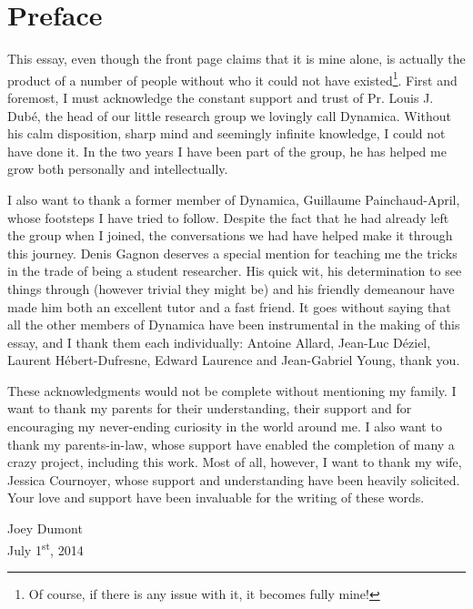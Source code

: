 \chapter*{Preface}
\renewcommand*{\thefootnote}{\fnsymbol{footnote}}
This essay, even though the front page claims that it is mine alone, 
is actually the product of a number of people without who it
could not have existed\footnote{Of course, if there is any issue
with it, it becomes fully mine!}. First and foremost, I must acknowledge
the constant support and trust of Pr. Louis J. Dubé, the head
of our little research group we lovingly call Dynamica. Without his calm
disposition, sharp mind and seemingly infinite knowledge, I could not have done it.
In the two years I have been part of the group, he has helped
me grow both personally and intellectually. 

I also want to thank a former member of Dynamica, 
Guillaume Painchaud-April, whose footsteps I have
tried to follow. Despite the fact that he had already left
the group when I joined, the conversations we had have helped
make it through this journey. Denis Gagnon deserves a special mention
for teaching me the tricks in the trade of being a student
researcher. His quick wit, his determination to see things through
(however trivial they might be) 
and  his friendly demeanour have made him both an excellent tutor 
and a fast friend. It goes without saying that all the other
members of Dynamica have been instrumental in the making 
of this essay, and I thank them each individually: Antoine 
Allard, Jean-Luc Déziel, Laurent Hébert-Dufresne, Edward
Laurence and Jean-Gabriel Young, thank you. 

These acknowledgments would not be complete without
mentioning my family. I want to thank my parents 
for their understanding, their support and for 
encouraging my never-ending curiosity in the world around me. I also 
want to thank my parents-in-law, whose support 
have enabled the completion of many a crazy project, 
including this work. Most of all, however, I want to 
thank my wife, Jessica Cournoyer, whose support and 
understanding have been heavily solicited. Your love and support
have been invaluable for the writing of these words. 

\begin{flushright}
Joey Dumont\\
July 1\textsuperscript{st}, 2014
\end{flushright}